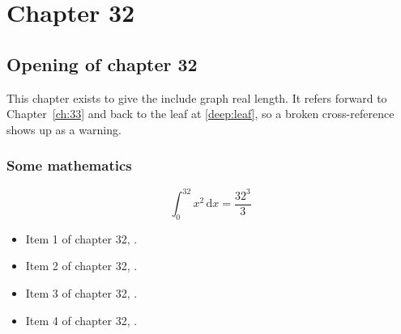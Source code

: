 \chapter{Chapter 32}
\label{ch:32}
\section{Opening of chapter 32}
This chapter exists to give the include graph real length. It refers
forward to Chapter~\ref{ch:33} and back to the leaf
at \ref{deep:leaf}, so a broken cross-reference shows up as a warning.

\subsection{Some mathematics}
\begin{equation}
  \int_0^{32} x^{2} \, \mathrm{d}x = \frac{32^{3}}{3}
\end{equation}

\begin{itemize}
  \item Item 1 of chapter 32, .
  \item Item 2 of chapter 32, .
  \item Item 3 of chapter 32, .
  \item Item 4 of chapter 32, .
\end{itemize}
